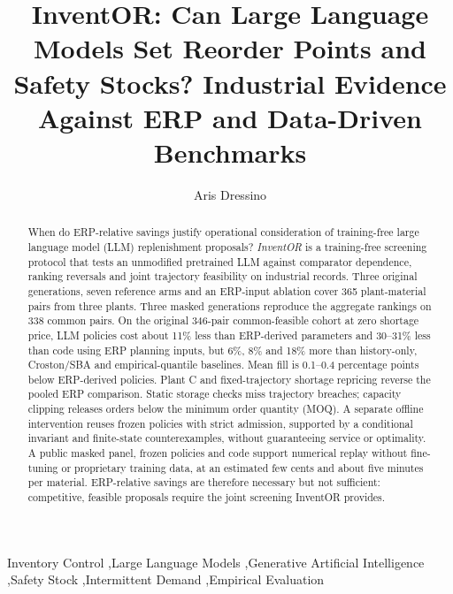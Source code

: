 \documentclass[preprint,12pt,nonatbib]{elsarticle}
\begin{document}
\begin{frontmatter}

\title{InventOR: Can Large Language Models Set Reorder Points and Safety Stocks? Industrial Evidence Against ERP and Data-Driven Benchmarks}

\author[inst1]{Aris Dressino}


\begin{abstract}
When do ERP-relative savings justify operational consideration of training-free large language model (LLM) replenishment proposals? \emph{InventOR} is a training-free screening protocol that tests an unmodified pretrained LLM against comparator dependence, ranking reversals and joint trajectory feasibility on industrial records. Three original generations, seven reference arms and an ERP-input ablation cover 365 plant-material pairs from three plants. Three masked generations reproduce the aggregate rankings on 338 common pairs. On the original 346-pair common-feasible cohort at zero shortage price, LLM policies cost about 11\% less than ERP-derived parameters and 30--31\% less than code using ERP planning inputs, but 6\%, 8\% and 18\% more than history-only, Croston/SBA and empirical-quantile baselines. Mean fill is 0.1--0.4 percentage points below ERP-derived policies. Plant C and fixed-trajectory shortage repricing reverse the pooled ERP comparison. Static storage checks miss trajectory breaches; capacity clipping releases orders below the minimum order quantity (MOQ). A separate offline intervention reuses frozen policies with strict admission, supported by a conditional invariant and finite-state counterexamples, without guaranteeing service or optimality. A public masked panel, frozen policies and code support numerical replay without fine-tuning or proprietary training data, at an estimated few cents and about five minutes per material. ERP-relative savings are therefore necessary but not sufficient: competitive, feasible proposals require the joint screening InventOR provides.
\end{abstract}

\begin{keyword}
Inventory Control \sep Large Language Models \sep Generative Artificial Intelligence \sep Safety Stock \sep Intermittent Demand \sep Empirical Evaluation
\end{keyword}

\end{frontmatter}
\end{document}
